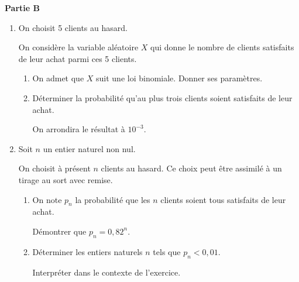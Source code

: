 \medskip

\textbf{Partie B}

\smallskip

\begin{enumerate}
	\item On choisit 5 clients au hasard. 
	
	On considère la variable aléatoire $X$ qui donne le nombre de clients satisfaits de leur achat parmi ces 5 clients.
	\begin{enumerate}
		\item On admet que $X$ suit une loi binomiale. Donner ses paramètres.
		\item Déterminer la probabilité qu'au plus trois clients soient satisfaits de leur achat.
		
		On arrondira le résultat à $10^{-3}$.
	\end{enumerate}
	\item Soit $n$ un entier naturel non nul.
	
	On choisit à présent $n$ clients au hasard. Ce choix peut être assimilé à un tirage au sort avec remise.
	\begin{enumerate}
		\item On note $p_n$ la probabilité que les $n$ clients soient tous satisfaits de leur achat.
		
		Démontrer que $p_n = 0,82^n$.
		\item Déterminer les entiers naturels $n$ tels que $p_n < 0,01$. 
		
		Interpréter dans le contexte de l'exercice.
	\end{enumerate}
\end{enumerate}
